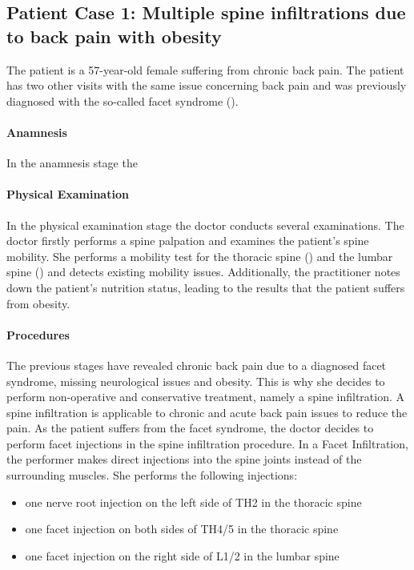 \subsection{Patient Case 1: Multiple spine infiltrations due to back pain with obesity}\label{subsec:patient-a---multiple-spine-infiltrations-due-to-backpain-with-obesity}
The patient is a 57-year-old female suffering from chronic back pain.
The patient has two other visits with the same issue concerning back pain and was previously diagnosed with the so-called facet syndrome ().

\paragraph{Anamnesis}
In the anamnesis stage the

\paragraph{Physical Examination}
In the physical examination stage the doctor conducts several examinations.
The doctor firstly performs a spine palpation and examines the patient's spine mobility.
She performs a mobility test for the thoracic spine () and the lumbar spine () and detects existing mobility issues.
Additionally, the practitioner notes down the patient's nutrition status, leading to the results that the patient suffers from obesity.

\paragraph{Procedures}
The previous stages have revealed chronic back pain due to a diagnosed facet syndrome, missing neurological issues and obesity.
This is why she decides to perform non-operative and conservative treatment, namely a spine infiltration.
A spine infiltration is applicable to chronic and acute back pain issues to reduce the pain.
As the patient suffers from the facet syndrome, the doctor decides to perform facet injections in the spine infiltration procedure.
In a Facet Infiltration, the performer makes direct injections into the spine joints instead of the surrounding muscles.
She performs the following injections:
\begin{itemize}
    \item one nerve root injection on the left side of TH2 in the thoracic spine
    \item one facet injection on both sides of TH4/5 in the thoracic spine
    \item one facet injection on the right side of L1/2 in the lumbar spine
\end{itemize}

